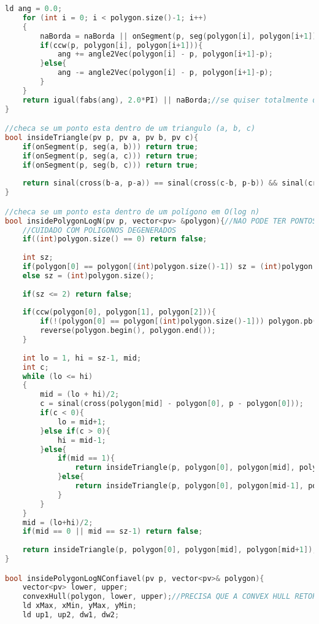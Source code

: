\documentclass[12pt,a4paper, twoside]{report}
\begin{document}
\begin{lstlisting}[caption=Funções de polígono,language=C++]
    ld ang = 0.0;
    for (int i = 0; i < polygon.size()-1; i++)
    {
        naBorda = naBorda || onSegment(p, seg(polygon[i], polygon[i+1]));
        if(ccw(p, polygon[i], polygon[i+1])){
            ang += angle2Vec(polygon[i] - p, polygon[i+1]-p);
        }else{
            ang -= angle2Vec(polygon[i] - p, polygon[i+1]-p);
        }
    }
    return igual(fabs(ang), 2.0*PI) || naBorda;//se quiser totalmente dentro tem que ver se ele ta na borda
}

//checa se um ponto esta dentro de um triangulo (a, b, c)   
bool insideTriangle(pv p, pv a, pv b, pv c){
    if(onSegment(p, seg(a, b))) return true;
    if(onSegment(p, seg(a, c))) return true;
    if(onSegment(p, seg(b, c))) return true;
    
    return sinal(cross(b-a, p-a)) == sinal(cross(c-b, p-b)) && sinal(cross(c-b, p-b)) == sinal(cross(a-c, p-c));
}

//checa se um ponto esta dentro de um polígono em O(log n)   
bool insidePolygonLogN(pv p, vector<pv> &polygon){//NAO PODE TER PONTOS COLINEARES
    //CUIDADO COM POLIGONOS DEGENERADOS
    if((int)polygon.size() == 0) return false;
    
    int sz;
    if(polygon[0] == polygon[(int)polygon.size()-1]) sz = (int)polygon.size()-1;
    else sz = (int)polygon.size();
    
    if(sz <= 2) return false;
    
    if(ccw(polygon[0], polygon[1], polygon[2])){
        if(!(polygon[0] == polygon[(int)polygon.size()-1])) polygon.pb(polygon[0]);
        reverse(polygon.begin(), polygon.end());
    }
    
    int lo = 1, hi = sz-1, mid;
    int c;
    while (lo <= hi)
    {
        mid = (lo + hi)/2;
        c = sinal(cross(polygon[mid] - polygon[0], p - polygon[0]));
        if(c < 0){
            lo = mid+1;
        }else if(c > 0){
            hi = mid-1;
        }else{
            if(mid == 1){
                return insideTriangle(p, polygon[0], polygon[mid], polygon[mid+1]);
            }else{
                return insideTriangle(p, polygon[0], polygon[mid-1], polygon[mid]);
            }
        }
    }
    mid = (lo+hi)/2;
    if(mid == 0 || mid == sz-1) return false;
    
    return insideTriangle(p, polygon[0], polygon[mid], polygon[mid+1]);
}

bool insidePolygonLogNConfiavel(pv p, vector<pv>& polygon){
    vector<pv> lower, upper;
    convexHull(polygon, lower, upper);//PRECISA QUE A CONVEX HULL RETORNE A LOWER E UPPER HULL
    ld xMax, xMin, yMax, yMin;
    ld up1, up2, dw1, dw2;
    

\end{lstlisting}
\end{document}
